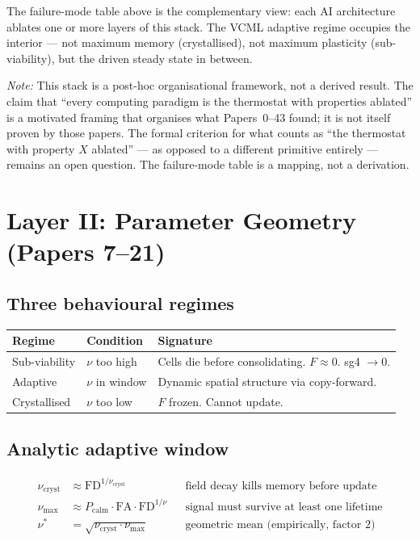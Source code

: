\documentclass[11pt]{article}
\begin{document}
The failure-mode table above is the complementary view: each AI architecture
ablates one or more layers of this stack.
The VCML adaptive regime occupies the interior --- not maximum memory (crystallised),
not maximum plasticity (sub-viability), but the driven steady state in between.

\textit{Note:} This stack is a post-hoc organisational framework, not a derived result.
The claim that ``every computing paradigm is the thermostat with properties ablated'' is
a motivated framing that organises what Papers~0--43 found; it is not itself proven by
those papers.
The formal criterion for what counts as ``the thermostat with property $X$ ablated'' ---
as opposed to a different primitive entirely --- remains an open question.
The failure-mode table is a mapping, not a derivation.

\section{Layer II: Parameter Geometry (Papers 7--21)}

\subsection{Three behavioural regimes}

\begin{center}
\begin{tabular}{lll}
\toprule
Regime & Condition & Signature \\
\midrule
Sub-viability & $\nu$ too high & Cells die before consolidating. $F \approx 0$. sg4 $\to 0$. \\
Adaptive & $\nu$ in window & Dynamic spatial structure via copy-forward. \\
Crystallised & $\nu$ too low & $F$ frozen. Cannot update. \\
\bottomrule
\end{tabular}
\end{center}

\subsection{Analytic adaptive window}

\begin{align}
\nu_\mathrm{cryst} &\approx \mathrm{FD}^{1/\nu_\mathrm{cryst}} && \text{field decay kills memory before update} \\
\nu_\mathrm{max}   &\approx P_\mathrm{calm} \cdot \mathrm{FA} \cdot \mathrm{FD}^{1/\nu} && \text{signal must survive at least one lifetime} \\
\nu^*              &= \sqrt{\nu_\mathrm{cryst} \cdot \nu_\mathrm{max}} && \text{geometric mean (empirically, factor 2)}
\end{align}
\end{document}
